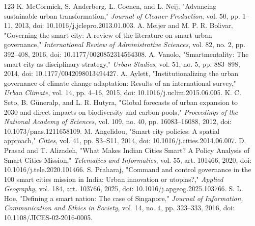 \documentclass[journal]{IEEEtran}
\begin{document}
\begin{thebibliography}{123}
 K. McCormick, S. Anderberg, L. Coenen, and L. Neij, "Advancing sustainable urban transformation," \emph{Journal of Cleaner Production}, vol. 50, pp. 1--11, 2013, doi: 10.1016/j.jclepro.2013.01.003.
 A. Meijer and M. P. R. Bolivar, "Governing the smart city: A review of the literature on smart urban governance," \emph{International Review of Administrative Sciences}, vol. 82, no. 2, pp. 392--408, 2016, doi: 10.1177/0020852314564308.
 A. Vanolo, "Smartmentality: The smart city as disciplinary strategy," \emph{Urban Studies}, vol. 51, no. 5, pp. 883--898, 2014, doi: 10.1177/0042098013494427.
 A. Aylett, "Institutionalizing the urban governance of climate change adaptation: Results of an international survey," \emph{Urban Climate}, vol. 14, pp. 4--16, 2015, doi: 10.1016/j.uclim.2015.06.005.
 K. C. Seto, B. G\"uneralp, and L. R. Hutyra, "Global forecasts of urban expansion to 2030 and direct impacts on biodiversity and carbon pools," \emph{Proceedings of the National Academy of Sciences}, vol. 109, no. 40, pp. 16083--16088, 2012, doi: 10.1073/pnas.1211658109.
 M. Angelidou, "Smart city policies: A spatial approach," \emph{Cities}, vol. 41, pp. S3--S11, 2014, doi: 10.1016/j.cities.2014.06.007.
 D. Prasad and T. Alizadeh, "What Makes Indian Cities Smart? A Policy Analysis of Smart Cities Mission," \emph{Telematics and Informatics}, vol. 55, art. 101466, 2020, doi: 10.1016/j.tele.2020.101466.
 S. Praharaj, "Command and control governance in the 100 smart cities mission in India: Urban innovation or utopias?," \emph{Applied Geography}, vol. 184, art. 103766, 2025, doi: 10.1016/j.apgeog.2025.103766.
 S. L. Hoe, "Defining a smart nation: The case of Singapore," \emph{Journal of Information, Communication and Ethics in Society}, vol. 14, no. 4, pp. 323--333, 2016, doi: 10.1108/JICES-02-2016-0005.

\end{thebibliography}
\end{document}
